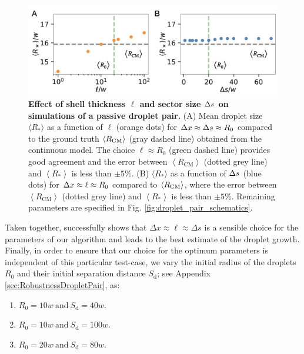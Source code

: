 \begin{figure}[tb]
\centering
\includegraphics[scale=0.5]{MainContent/Figures/droplet_pair.pdf}
\caption{\textbf{Effect of shell thickness $\ell$ and sector size $\Delta s$ on simulations of a passive droplet pair.}
(A) Mean droplet size $\langle R_\ast \rangle$ as a function of $\ell$ (orange dots) for $\Delta x \approx \Delta s \approx R_0$ compared to the ground truth $\langle R_\mathrm{CM}\rangle$ (gray dashed line) obtained from the continuous model.
The choice $\ell \approx R_0$ (green dashed line) provides good agreement and the error between $\left \langle R_\mathrm{CM} \right \rangle$ (dotted grey line) and $\left \langle R_\ast \right \rangle$ is less than $\pm 5\%$.
(B) $\langle R_\ast \rangle$ as a function of $\Delta s$ (blue dots) for $\Delta x \approx \ell \approx R_0$ compared to $\langle R_\mathrm{CM}\rangle$, where the error between $\left \langle R_\mathrm{CM} \right \rangle$ (dotted grey line) and $\left \langle R_\ast \right \rangle$ is less than $\pm 5\%$.
Remaining parameters are specified in Fig. \ref{fig:droplet_pair_schematics}.
}
\label{fig:shell_parameters}
\end{figure}

Taken together,  successfully shows that $\Delta x \approx \ell \approx \Delta s$ is a sensible choice for the parameters of our algorithm and leads to the best estimate of the droplet growth.
Finally, in order to ensure that our choice for the optimum parameters is independent of this particular test-case, we vary the initial radius of the droplets $R_0$ and their initial separation distance $S_\mathrm{d}$; see Appendix \ref{sec:RobustnessDropletPair}, as:

\begin{enumerate}
    \item $R_0 = 10w \mathrm{~and~} S_\mathrm{d} = 40w$.
    \item $R_0 = 10w \mathrm{~and~} S_\mathrm{d} = 100w$.
    \item $R_0 = 20w \mathrm{~and~} S_\mathrm{d} = 80w$.
\end{enumerate}

